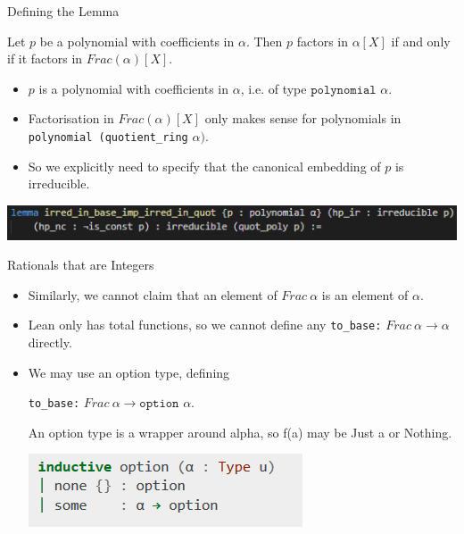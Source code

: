 \documentclass{beamer}
\begin{document}
\begin{frame}{Defining the Lemma}

  \begin{theorem}
    Let $p$ be a polynomial with coefficients in $\alpha$. Then $p$ factors in $\alpha[X]$ if and only if it factors in $Frac(\alpha)[X]$.
  \end{theorem}

  \begin{itemize}
    \item $p$ is a polynomial with coefficients in $\alpha$, i.e. of type $\texttt{polynomial } \alpha$. 
    \item Factorisation in $Frac(\alpha)[X]$ only makes sense for polynomials in \texttt{polynomial (quotient\_ring} $ \alpha\texttt{)}$. 
    \item So we explicitly need to specify that the canonical embedding of $p$ is irreducible. 
  \end{itemize}

  \includegraphics[width=\textwidth]{gauss_fwd.png}
  
\end{frame}

\begin{frame}{Rationals that are Integers}

  \begin{itemize}
    \item  Similarly, we cannot claim that an element of $Frac\ \alpha$ is an element of $\alpha$. 
    \item Lean only has total functions, so we cannot define any \texttt{to\_base:} $Frac\ \alpha \rightarrow \alpha$ directly. 
    \item We may use an option type, defining 

    \texttt{to\_base:} $Frac\ \alpha \rightarrow \texttt{option } \alpha$. 

    An option type is a wrapper around alpha, so f(a) may be Just a or Nothing. 


    \includegraphics[]{option.png}

  \end{itemize}

\end{frame}
\end{document}
